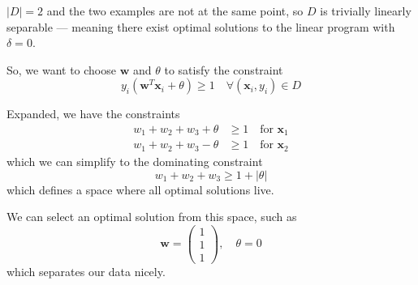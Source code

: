 \documentclass[11pt]{article}
\newenvironment{solution}{\color{blue}{\bf Solution:}}{}
\begin{document}
\begin{enumerate}
    \begin{solution}
      $|D| = 2$ and the two examples are not at the same point, so $D$ is
      trivially linearly separable --- meaning there exist optimal solutions to
      the linear program with $\delta = 0$.

      So, we want to choose $\mathbf{w}$ and $\theta$ to satisfy the constraint
      \[
        y_i(\mathbf{w}^T \mathbf{x}_i + \theta) \geq 1 \quad\forall(\mathbf{x}_i, y_i) \in D
      \]

      Expanded, we have the constraints
      \begin{align*}
        w_1 + w_2 + w_3 + \theta &\geq 1 \quad\text{for }\mathbf{x}_1\\
        w_1 + w_2 + w_3 - \theta &\geq 1 \quad\text{for }\mathbf{x}_2
      \end{align*}
      which we can simplify to the dominating constraint
      \[
        w_1 + w_2 + w_3 \geq 1 + |\theta|
      \]
      which defines a space where all optimal solutions live.

      We can select an optimal solution from this space, such as
      \[
        \mathbf{w} = \begin{pmatrix}1\\1\\1\end{pmatrix}, \quad \theta = 0
      \]
      which separates our data nicely.
      
    \end{solution}

\end{enumerate}
\end{document}
